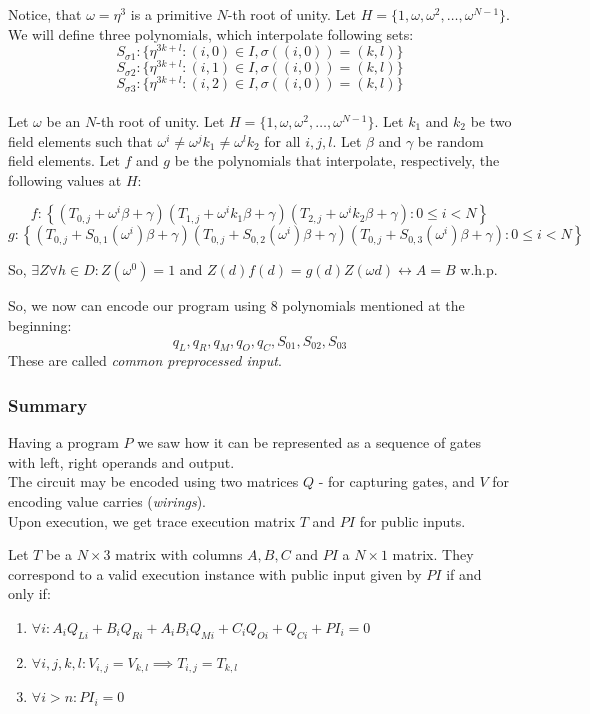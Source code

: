 \documentclass[../lecture-notes.tex]{subfiles}
\begin{document}
Notice, that $\omega = \eta^3$ is a primitive $N$-th root of unity. Let \(H = \{1, \omega, \omega^2, \ldots, \omega^{N-1}\}\). 
We will define three polynomials, which interpolate following sets:
\[S_{\sigma 1}: \{\eta^{3k+l} : (i, 0) \in I, \sigma((i, 0)) = (k, l)\}\]
\[S_{\sigma 2}: \{\eta^{3k+l} : (i, 1) \in I, \sigma((i, 0)) = (k, l)\}\]
\[S_{\sigma 3}: \{\eta^{3k+l} : (i, 2) \in I, \sigma((i, 0)) = (k, l)\}\]
\\
Let $\omega$ be an $N$-th root of unity. Let $H = \{1, \omega, \omega^2, \ldots, \omega^{N-1}\}$. Let $k_1$ and $k_2$ be two field elements such that $\omega^i \neq \omega^j k_1 \neq \omega^l k_2$ for all $i, j, l$. Let $\beta$ and $\gamma$ be random field elements. Let $f$ and $g$ be the polynomials that interpolate, respectively, the following values at $H$:

\[f: \left\{\left(T_{0,j} + \omega^i \beta + \gamma\right)\left(T_{1,j} + \omega^i k_1 \beta + \gamma\right)\left(T_{2,j} + \omega^i k_2 \beta + \gamma\right) : 0 \leq i < N\right\}\]
\[g: \left\{\left(T_{0,j} + S_{0,1}(\omega^i) \beta + \gamma\right)\left(T_{0,j} + S_{0,2}(\omega^i) \beta + \gamma\right)\left(T_{0,j} + S_{0,3}(\omega^i) \beta + \gamma\right) : 0 \leq i < N\right\}\]

So, \(\exists Z \forall h \in D: Z(\omega^{0}) = 1\) and  \(Z(d)f(d) = g(d)Z(\omega d) \leftrightarrow A = B\) w.h.p.

So, we now can encode our program using 8 polynomials mentioned at the beginning:
\[q_L, q_R, q_M, q_O, q_C, S_{01}, S_{02}, S_{03}\]
These are called \textit{common preprocessed input}.

\subsubsection{Summary}
Having a program $P$ we saw how it can be represented as a sequence of gates with left, right operands and output. 
\\
The circuit may be encoded using two matrices $Q$ - for capturing gates, and $V$ for encoding value carries (\textit{wirings}).
\\
Upon execution, we get trace execution matrix $T$ and $PI$ for public inputs.

\begin{definition}
Let $T$ be a $N \times 3$ matrix with columns $A, B, C$ and $PI$ a $N \times 1$ matrix. They correspond to a valid execution instance with public input given by $PI$ if and only if:

\begin{enumerate}
    \item \(\forall i: A_iQ_{Li} + B_iQ_{Ri} + A_iB_iQ_{Mi} + C_iQ_{Oi} + Q_{Ci} + PI_i = 0\)
    \item \(\forall i, j, k, l: V_{i,j} = V_{k,l} \implies T_{i,j} = T_{k,l}\)
    \item \(\forall i > n: PI_i = 0\)
\end{enumerate}
\end{definition}
\end{document}
